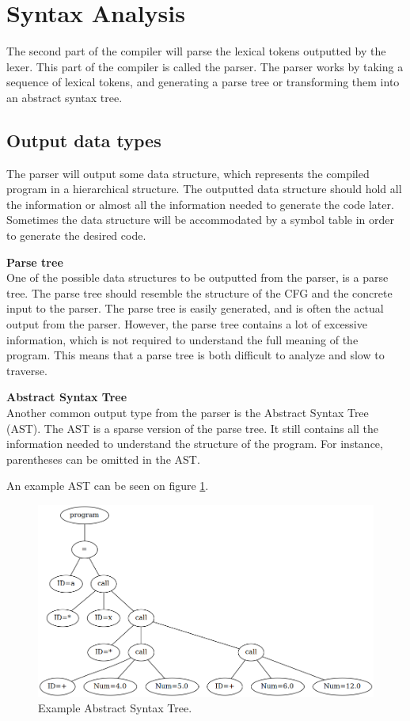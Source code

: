 \section{Syntax Analysis}
The second part of the compiler will parse the lexical tokens outputted by the lexer. 
This part of the compiler is called the parser. 
The parser works by taking a sequence of lexical tokens, and generating a parse tree or transforming them into an abstract syntax tree. 

\subsection{Output data types}
The parser will output some data structure, which represents the compiled program in a hierarchical structure. 
The outputted data structure should hold all the information or almost all the information needed to generate the code later. 
Sometimes the data structure will be accommodated by a symbol table in order to generate the desired code.

\textbf{Parse tree}\\
One of the possible data structures to be outputted from the parser, is a parse tree. 
The parse tree should resemble the structure of the CFG and the concrete input to the parser. 
The parse tree is easily generated, and is often the actual output from the parser. 
However, the parse tree contains a lot of excessive information, which is not required to understand the full meaning of the program. 
This means that a parse tree is both difficult to analyze and slow to traverse. 

\textbf{Abstract Syntax Tree}\\
Another common output type from the parser is the Abstract Syntax Tree (AST).
The AST is a sparse version of the parse tree. 
It still contains all the information needed to understand the structure of the program. 
For instance, parentheses can be omitted in the AST.

An example AST can be seen on figure \ref{fig:ast}.

\begin{figure}[H]
	\centering
	\includegraphics[width=\textwidth*5/6]{3.Theory/images/ast.png}
	\caption{
		Example Abstract Syntax Tree.
	}
	\label{fig:ast}
\end{figure}

